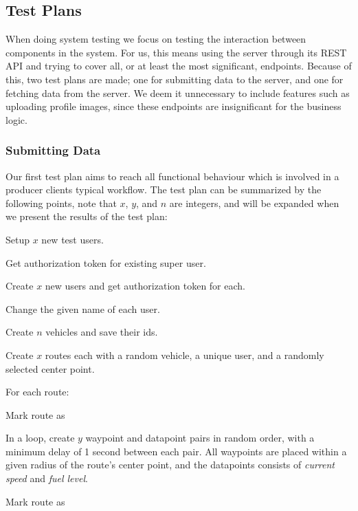 \subsection{Test Plans}
When doing system testing we focus on testing the interaction between components in the system.
For us, this means using the server through its REST API and trying to cover all, or at least the most significant, endpoints.
Because of this, two test plans are made; one for submitting data to the server, and one for fetching data from the server.
We deem it unnecessary to include features such as uploading profile images, since these endpoints are insignificant for the business logic.

\subsubsection*{Submitting Data}
Our first test plan aims to reach all functional behaviour which is involved in a producer clients typical workflow.
The test plan can be summarized by the following points, note that $x$, $y$, and $n$ are integers, and will be expanded when we present the results of the test plan:
\begin{enumberate}
    \item Setup $x$ new test users.
    \begin{enumberate}
        \item Get authorization token for existing super user.
        \item Create $x$ new users and get authorization token for each.
        \item Change the given name of each user.
    \end{enumberate}
    \item Create $n$ vehicles and save their ids.
    \item Create $x$ routes each with a random vehicle, a unique user, and a randomly selected center point.
    \item For each route:
    \begin{enumberate}
        \item Mark route as 
        \item In a loop, create $y$ waypoint and datapoint pairs in random order, with a minimum delay of 1 second between each pair.
              All waypoints are placed within a given radius of the route's center point, and the datapoints consists of \textit{current speed} and \textit{fuel level}.
        \item Mark route as 
    \end{enumberate}
\end{enumberate}

